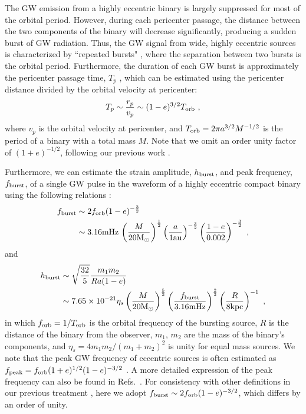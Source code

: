 \documentclass[%
 reprint,
 amsmath,amssymb,
 aps,
]{revtex4-2}
\begin{document}
The GW emission from a highly eccentric binary is largely suppressed for most of the orbital period. However, during each pericenter passage, the distance between the two components of the binary will decrease significantly, 
producing a sudden burst of GW radiation. Thus, the GW signal from wide, highly eccentric sources is characterized by ``repeated bursts" \citep{kocsis06,Kocsis_2012,Tai_2014,Loutrel_2017,Gondan_2018b,fangx19,knee2024detectinggravitationalwaveburstsblack}, where the separation between two bursts is the orbital period. Furthermore, the duration of each GW burst is approximately the pericenter passage time, $T_p$ \citep[][]{O'Leary+09,Xuan+23b}, which can be estimated using the pericenter distance divided by the orbital velocity at pericenter:
\begin{equation}
   T_{p} \sim \frac{r_p}{v_p} \sim (1-e)^{3/2} T_{\rm orb} \ ,
    \label{eq:time0}
\end{equation}
where $v_p$ is the orbital velocity at pericenter, and $T_{\rm orb}=2\pi a^{3/2} M^{-1/2}$ is the period of a binary with a total mass $M$. Note that we omit an order unity factor of $(1+e)^{-1/2}$, following our previous work \citep{Xuan+23b}.

Furthermore, we can estimate the strain amplitude, $h_{\rm burst}$, and peak frequency, $f_{\rm burst}$, of a single GW pulse in the waveform of a highly eccentric compact binary using the following relations \citep{Xuan+23b}:
\begin{align}
    f_{\rm burst}&\sim 2f_{\rm orb}(1-e)^{-\frac{3}{2}} \nonumber\\
    &\sim 3.16 {\rm mHz}\, \left(\frac{M}{20\rm M_{\odot}}\right)^{\frac{1}{2}} \left(\frac{a}{1\rm au}\right)^{-\frac{3}{2}}\left(\frac{1-e}{0.002}\right)^{-\frac{3}{2}} \ ,
    \label{eq:fpeak}
\end{align}
and
\begin{align}
    h_{\rm burst} &\sim \sqrt{\frac{32}{5}}\frac{m_1m_2}{Ra(1-e)}\nonumber\\
    &\sim  7.65\times 10^{-21}\eta_s \left(\frac{M}{20\rm M_{\odot}}\right)^{\frac{5}{3}} \left(\frac{f_{\rm burst}}{3.16\rm mHz}\right)^{\frac{2}{3}}\left(\frac{R}{8\rm kpc}\right)^{-1}\ ,
        \label{eq:hburst}
\end{align}
in which $f_{\rm orb}=1/T_{\rm orb}$ is the orbital frequency of the bursting source, $R$ is the distance of the binary from the observer, $m_1,\, m_2$ are the mass of the binary's components, and $\eta_s=4 m_1m_2/(m_1+m_2)^{2}$ is unity for equal mass sources. We note that the peak GW frequency of eccentric sources is often estimated as $f_{\rm peak} = f_{\rm orb} (1+e)^{1/2} (1-e)^{-3/2}$ \citep{O'Leary+09}. A more detailed expression of the peak frequency can also be found in Refs.~\citep{wen03,Randall_2022}. For consistency with other definitions in our previous treatment \citep{Xuan+23b}, here we adopt $f_{\rm burst}\sim 2 f_{\rm orb} (1-e)^{-3/2}$, which differs by an order of unity.
\end{document}
